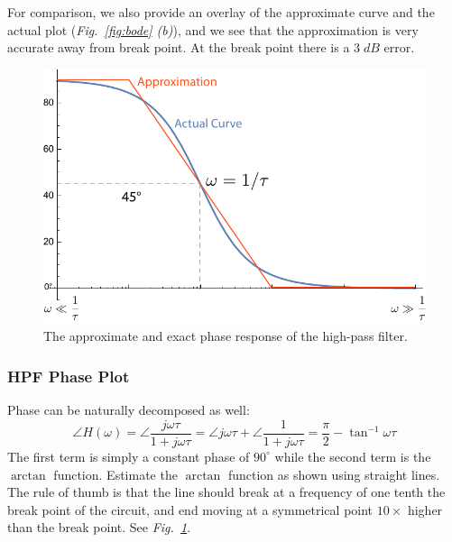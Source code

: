 For comparison, we also provide an overlay of the approximate curve and the actual plot (\emph{Fig.~\ref{fig:bode} (b)}), and we see that the approximation is very accurate away from break point.  At the break point there is a $3\;dB$ error.
\newpage
\begin{figure}[t]
\centering
\includegraphics[width=.75\columnwidth]{mod1_3_12_bode4}
\caption{The approximate and exact phase response of the high-pass filter.}
\label{fig:bode_phase}
\end{figure}
\subsubsection{HPF Phase Plot}
Phase can be naturally decomposed as well:
    \begin{equation}
        \angle H(\omega ) = \angle \frac{{j\omega \tau }}{{1 + j\omega \tau }} = \angle j\omega \tau + \angle \frac{1}{{1 + j\omega \tau }} = \frac{\pi }{2} - {\tan ^{ - 1}}\omega \tau
    \end{equation}
The first term is simply a constant phase of $90^\circ$ while the second term is the $\arctan$ function.  Estimate the $\arctan$ function as shown using straight lines.  The rule of thumb is that the line should break at a frequency of one tenth the break point of the circuit, and end moving at a symmetrical point $10\times$ higher than the break point.  See \emph{Fig.~\ref{fig:bode_phase}}.
